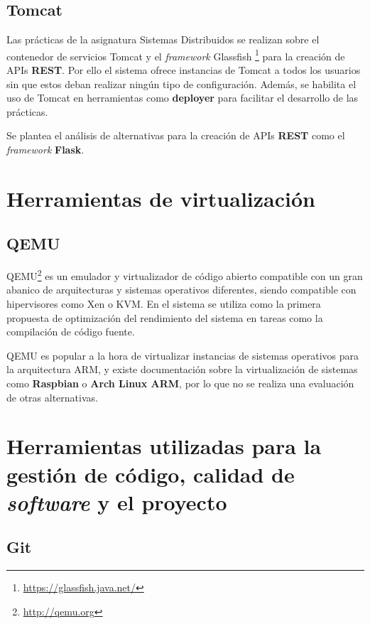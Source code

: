 \subsection{Tomcat}

Las prácticas de la asignatura Sistemas Distribuidos se realizan sobre el contenedor de servicios Tomcat y el \textit{framework} Glassfish \footnote{\href{https://glassfish.java.net/}{https://glassfish.java.net/}} para la creación de APIs \textbf{REST}. Por ello el sistema ofrece instancias de Tomcat a todos los usuarios sin que estos deban realizar ningún tipo de configuración. Además, se habilita el uso de Tomcat en herramientas como \textbf{deployer} para facilitar el desarrollo de las prácticas.

Se plantea el análisis de alternativas para la creación de APIs \textbf{REST} como el \textit{framework} \textbf{Flask}.

\section{Herramientas de virtualización}

\subsection{QEMU}

QEMU\footnote{\href{http://qemu.org}{http://qemu.org}} es un emulador y virtualizador de código abierto compatible con un gran abanico de arquitecturas y sistemas operativos diferentes, siendo compatible con hipervisores como Xen o KVM. En el sistema se utiliza como la primera propuesta de optimización del rendimiento del sistema en tareas como la compilación de código fuente.

QEMU es popular a la hora de virtualizar instancias de sistemas operativos para la arquitectura ARM, y existe documentación sobre la virtualización de sistemas como \textbf{Raspbian} o \textbf{Arch Linux ARM}, por lo que no se realiza una evaluación de otras alternativas.

\section{Herramientas utilizadas para la gestión de código, calidad de \textit{software} y el proyecto}

\subsection{Git}

